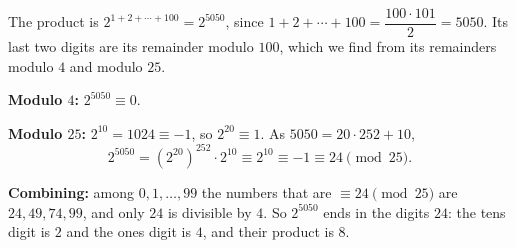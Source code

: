 The product is $2^{1+2+\cdots+100}=2^{5050}$, since $1+2+\cdots+100=\dfrac{100\cdot101}{2}=5050$. Its last two digits are its remainder modulo $100$, which we find from its remainders modulo $4$ and modulo $25$.

\textbf{Modulo $4$:} $2^{5050}\equiv0$.

\textbf{Modulo $25$:} $2^{10}=1024\equiv-1$, so $2^{20}\equiv1$. As $5050=20\cdot252+10$,
\[2^{5050}=\left(2^{20}\right)^{252}\cdot2^{10}\equiv2^{10}\equiv-1\equiv24\pmod{25}.\]

\textbf{Combining:} among $0,1,\dots,99$ the numbers that are $\equiv24\pmod{25}$ are $24,49,74,99$, and only $24$ is divisible by $4$. So $2^{5050}$ ends in the digits $24$: the tens digit is $2$ and the ones digit is $4$, and their product is $\boxed{8}$.
